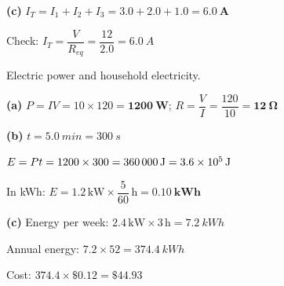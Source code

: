 \documentclass[addpoints]{exam}
\begin{document}
\begin{questions}
\begin{solution}[9cm]
\textbf{(c)} $I_T = I_1+I_2+I_3 = 3.0+2.0+1.0 = \mathbf{\SI{6.0}{A}}$

Check: $I_T = \dfrac{V}{R_{eq}} = \dfrac{12}{2.0} = \SI{6.0}{A}$ \checkmark
\end{solution}

\question Electric power and household electricity.
\begin{solution}[8cm]
\textbf{(a)} $P = IV = 10 \times 120 = \mathbf{\SI{1200}{W}}$;\quad
$R = \dfrac{V}{I} = \dfrac{120}{10} = \mathbf{\SI{12}{\ohm}}$

\textbf{(b)} $t = \SI{5.0}{min} = \SI{300}{s}$

$E = Pt = 1200 \times 300 = \mathbf{\SI{360\,000}{J} = \SI{3.6e5}{J}}$

In kWh: $E = 1.2\,\text{kW} \times \dfrac{5}{60}\,\text{h} = \mathbf{\SI{0.10}{kWh}}$

\textbf{(c)} Energy per week: $2.4\,\text{kW} \times 3\,\text{h} = \SI{7.2}{kWh}$

Annual energy: $7.2 \times 52 = \SI{374.4}{kWh}$

Cost: $374.4 \times \$0.12 = \mathbf{\$44.93}$
\end{solution}

\end{questions}
\end{document}
